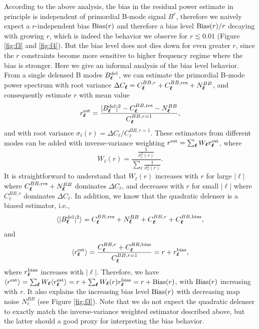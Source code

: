 \documentclass[iop,apj, numberedappendix]{emulateapj}
\def\be{\begin{equation}}
\def\ee{\end{equation}}
\newcommand*\Bell{\ensuremath{\boldsymbol\ell}}
\begin{document}
According to the above analysis, the bias in the residual power estimate
in principle is independent of primordial B-mode signal $B^r$,
therefore we naively expect a $r$-independent bias ${\rm Bias}(r)$
and therefore a bias level ${\rm Bias}(r)/r$ decaying with growing $r$, which is indeed the behavior we observe for
$r\lesssim 0.01$ (Figure \ref{fig:f3} and \ref{fig:f4}).
But the bias level does not dies down for even greater $r$,
since the $r$ constraints become more sensitive to higher frequency
regime where the bias is stronger. Here we give an informal analysis
of the  bias level behavior.
From a single delensed B modes $B^{\rm del}_{\Bell}$, we can estimate the primordial B-mode power spectrum
with root variance $\Delta C_{\Bell} = C^{BB,r}_{\Bell} + C^{BB,{\rm res}}_{\Bell} + N^{BB}_{\Bell}$,
and  consequently estimate $r$ with mean value
\be
r^{\rm est}_{\Bell} = \frac{|B^{\rm del}_{\Bell}|^2 - C^{BB,{\rm res}}_{\Bell}- N^{BB}_{\Bell}}{C^{BB,r=1}_{\Bell}},
\ee
and
with root variance $\sigma_{\Bell}(r) = \Delta C_{\Bell}/C^{BB,r=1}_{\Bell}$.
These estimators from different modes can be added with inverse-variance weighting
$r^{\rm est} = \sum_{\Bell} W_{\Bell} r^{\rm est}_{\Bell}$,
where
\be
W_{\Bell}(r) = \frac{\frac{1}{\sigma^2_{\Bell}(r)}}{\sum_{\Bell} \frac{1}{\sigma^2_{\Bell}(r)}}.
\ee
It is straightforward to understand that  $W_{\Bell}(r)$ increases with $r$ for large $|{\Bell}|$
where $C^{BB,{\rm res}}_{\Bell}+ N^{BB}_{\Bell}$ dominates $\Delta C_{\Bell}$,
and decreases with $r$ for small $|{\Bell}|$ where $C^{BB,r}_{\Bell} $ dominates $\Delta C_{\Bell}$.
In addition, we know that the quadratic delenser is a biased estimator, i.e.,
\be
\langle |B^{\rm del}_{\Bell}|^2 \rangle = C^{BB,{\rm res}}_{\Bell} + N^{BB}_{\Bell} + C^{BB,r}_{\Bell} + C^{BB,{\rm bias}}_{\Bell},
\ee
and
\be
\langle r^{\rm est}_{\Bell} \rangle = \frac{C^{BB,r}_{\Bell} + C^{BB,{\rm bias}}_{\Bell} }{C^{BB,r=1}_{\Bell}}
= r + r^{\rm bias}_{\Bell},
\ee
where $r^{\rm bias}_{\Bell}$ increases with $|{\Bell}|$.
Therefore, we have $\langle r^{\rm est}\rangle
= \sum_{\Bell} W_{\Bell} \langle r^{\rm est}_{\Bell}\rangle
= r   + \sum_{\Bell} W_{\Bell}(r) r^{\rm bias}_{\Bell}
= r   + {\rm Bias}(r)$,
with ${\rm Bias}(r)$ increasing with $r$.
It also explains the increasing bias level ${\rm Bias}(r)$ with
decreasing map noise $N^{BB}_{\Bell}$ (see Figure \ref{fig:f3}).
Note that we do not expect the quadratic delenser
to exactly match the inverse-variance weighted estimator described above, but the latter
should a good proxy for interpreting the bias behavior.
\end{document}
